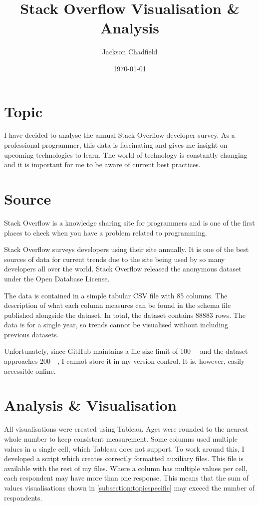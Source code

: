 \documentclass[listof=totoc]{scrartcl}
\title{Stack Overflow Visualisation \& Analysis}
\author{Jackson Chadfield}
\date{\today}
\begin{document}
\maketitle
\listoffigures

\section{Topic}
I have decided to analyse the annual Stack Overflow developer survey\cite{dataset}.
As a professional programmer, this data is fascinating and gives me insight on upcoming technologies to learn. The world of technology is constantly changing and it is important for me to be aware of current best practices.

\section{Source}
Stack Overflow is a knowledge sharing site for programmers and is one of the first places to check when you have a problem related to programming.

Stack Overflow surveys developers using their site annually. It is one of the best sources of data for current trends due to the site being used by so many developers all over the world. Stack Overflow released the anonymous dataset under the Open Database License.

The data is contained in a simple tabular CSV file with 85 columns. The description of what each column measures can be found in the schema file published alongside the dataset. In total, the dataset contains \num{88883} rows. The data is for a single year, so trends cannot be visualised without including previous datasets.

Unfortunately, since GitHub maintains a file size limit of \SI{100}{\mega\byte} and the dataset approaches \SI{200}{\mega\byte}, I cannot store it in my version control. It is, however, easily accessible online.

\section{Analysis \& Visualisation}
All visualisations were created using Tableau. Ages were rounded to the nearest whole number to keep consistent measurement. Some columns used multiple values in a single cell, which Tableau does not support. To work around this, I developed a script which creates correctly formatted auxiliary files. This file is available with the rest of my files\cite{repo}. Where a column has multiple values per cell, each respondent may have more than one response. This means that the sum of values visualisations shown in \autoref{subsection:topicspecific} may exceed the number of respondents.
\end{document}
